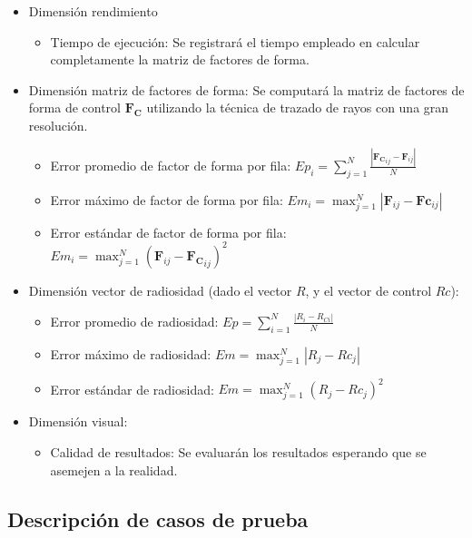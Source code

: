 \begin{itemize}
	\item Dimensión rendimiento
		\begin{itemize}
			\item Tiempo de ejecución: Se registrará el tiempo empleado en calcular completamente la matriz de factores de forma.
		\end{itemize}
	\item Dimensión matriz de factores de forma: Se computará la matriz de factores de forma de control $\mathbf{F_{C}}$ utilizando la técnica de trazado de rayos con una gran resolución.
		\begin{itemize}
			\item Error promedio de factor de forma por fila: $Ep_{i} = \sum_{j=1}^{N} \frac{|\mathbf{F_{C}}_{ij} -\mathbf{F}_{ij}|}{N}$
			\item Error máximo de factor de forma por fila: $Em_{i} = \max_{j=1}^{N}|\mathbf{F}_{ij} -\mathbf{Fc}_{ij}|$
			\item Error estándar de factor de forma por fila: $Em_{i} = \max_{j=1}^{N}(\mathbf{F}_{ij} -\mathbf{F_{C}}_{ij})^{2}$
		\end{itemize}
	\item Dimensión vector de radiosidad (dado el vector $R$, y el vector de control $Rc$):
	\begin{itemize}
		\item Error promedio de radiosidad: $Ep = \sum_{i=1}^{N} \frac{|R_{i}-R_{Ci}|}{N}$
		\item Error máximo de radiosidad: $Em = \max_{j=1}^{N}|R_{j} -Rc_{j}|$
		\item Error estándar de radiosidad: $Em = \max_{j=1}^{N}(R_{j} -Rc_{j})^{2}$
	\end{itemize}
\item Dimensión visual:
	\begin{itemize}
		\item Calidad de resultados: Se evaluarán los resultados esperando que se asemejen a la realidad.
	\end{itemize}
\end{itemize}

\subsection{Descripción de casos de prueba}

